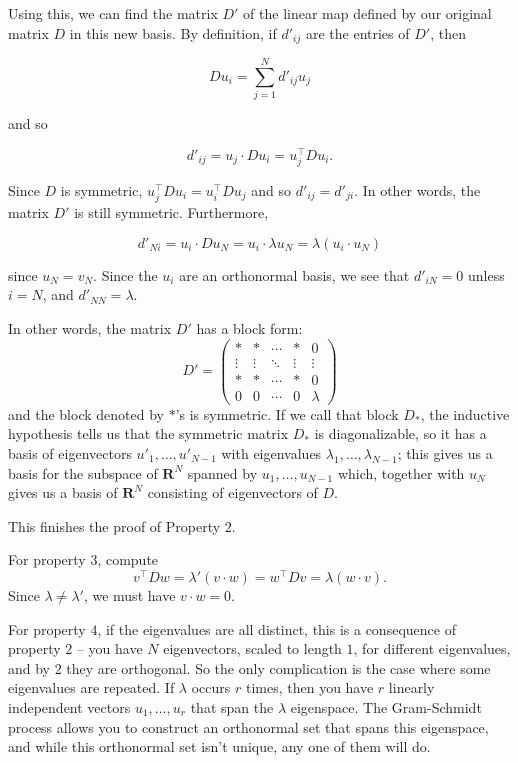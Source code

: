\documentclass[
  11pt,
  letterpaper,
]{scrbook}
\theoremstyle{plain}
\theoremstyle{remark}
\begin{document}
Using this, we can find the matrix \(D'\) of the linear map defined by
our original matrix \(D\) in this new basis. By definition, if
\(d'_{ij}\) are the entries of \(D'\), then

\[
Du_{i} = \sum_{j=1}^{N} d'_{ij} u_{j}
\]

and so

\[
d'_{ij} = u_{j}\cdot Du_{i} = u_{j}^{\intercal}Du_{i}.
\]

Since \(D\) is symmetric,
\(u_{j}^{\intercal}Du_{i} =u_{i}^{\intercal}Du_{j}\) and so
\(d'_{ij}=d'_{ji}\). In other words, the matrix \(D'\) is still
symmetric. Furthermore,

\[
d'_{Ni} = u_{i}\cdot Du_{N} = u_{i}\cdot \lambda u_{N} = \lambda (u_{i}\cdot u_{N})
\]

since \(u_{N}=v_{N}\). Since the \(u_{i}\) are an orthonormal basis, we
see that \(d'_{iN}=0\) unless \(i=N\), and \(d'_{NN}=\lambda\).

In other words, the matrix \(D'\) has a block form: \[
D' = \left(\begin{matrix} *&* & \cdots &*  & 0 \\ \vdots & \vdots & \ddots   & \vdots & \vdots \\
* & *& \cdots &*  & 0 \\
0 & 0 & \cdots &0 &\lambda \end{matrix}\right)
\] and the block denoted by \(*\)'s is symmetric. If we call that block
\(D_{*}\), the inductive hypothesis tells us that the symmetric matrix
\(D_{*}\) is diagonalizable, so it has a basis of eigenvectors
\(u'_{1},\ldots, u'_{N-1}\) with eigenvalues
\(\lambda_{1},\ldots, \lambda_{N-1}\); this gives us a basis for the
subspace of \(\mathbf{R}^{N}\) spanned by \(u_{1},\ldots, u_{N-1}\)
which, together with \(u_{N}\) gives us a basis of \(\mathbf{R}^{N}\)
consisting of eigenvectors of \(D\).

This finishes the proof of Property \(2\).

For property \(3\), compute \[
v^{\intercal}Dw = \lambda'(v\cdot w)=w^{\intercal}Dv = \lambda (w\cdot v).
\] Since \(\lambda\not=\lambda'\), we must have \(v\cdot w=0\).

For property \(4\), if the eigenvalues are all distinct, this is a
consequence of property \(2\) -- you have \(N\) eigenvectors, scaled to
length \(1\), for different eigenvalues, and by \(2\) they are
orthogonal. So the only complication is the case where some eigenvalues
are repeated. If \(\lambda\) occurs \(r\) times, then you have \(r\)
linearly independent vectors \(u_{1},\ldots, u_{r}\) that span the
\(\lambda\) eigenspace. The Gram-Schmidt process allows you to construct
an orthonormal set that spans this eigenspace, and while this
orthonormal set isn't unique, any one of them will do.
\end{document}
